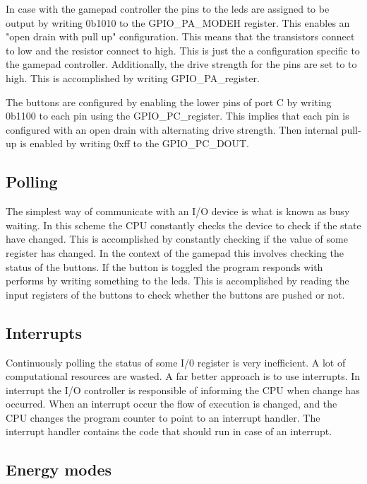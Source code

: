 In case with the gamepad controller the pins to the leds are assigned to be output by writing 0b1010 to the GPIO\_PA\_MODEH register. This enables an "open drain with pull up" configuration. This means that the transistors connect to low and the resistor connect to high. This is just the a configuration specific to the gamepad controller. Additionally, the drive strength for the pins are set to to high. This is accomplished by writing GPIO\_PA_\CTRL register. 

The buttons are configured by enabling the lower pins of port C by writing 0b1100 to each pin using the GPIO\_PC_\MODEL register. This implies that each pin is configured with an open drain with alternating drive strength. Then internal pull-up is enabled by writing 0xff to the GPIO\_PC\_DOUT. 




\subsection{Polling}\label{ch:polling}
The simplest way of communicate with an I/O device is what is known as busy waiting\cite{micro}. In this scheme the CPU constantly checks the device to check if the state have changed. This is accomplished by constantly checking if the value of some register has changed. In the context of the gamepad this involves checking the status of the buttons. If the button is toggled the program responds with performs by writing something to the leds. This is accomplished by reading the input registers of the buttons to check whether the buttons are pushed or not. 

\subsection{Interrupts}\label{ch:interrupts}
Continuously polling the status of some I/0 register is very inefficient. A lot of computational resources are wasted. A far better approach is to use interrupts. In interrupt the I/O controller is responsible of informing the CPU when change has occurred. When an interrupt occur the flow of execution is changed, and the CPU changes the program counter to point to an interrupt handler. The interrupt handler contains the code that should run in case of an interrupt.  


\subsection{Energy modes}\label{ch:energy_modes} 





